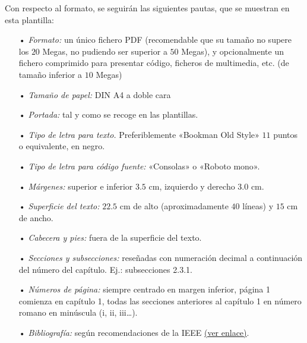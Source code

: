 Con respecto al formato, se seguirán las siguientes pautas, que se muestran en esta plantilla:
\begin{itemize}
\item[•] \textit{Formato:} un único fichero PDF (recomendable que su tamaño no supere los $20$ Megas, no pudiendo ser superior a $50$ Megas), y opcionalmente un fichero comprimido para presentar código, ficheros de multimedia, etc. (de tamaño inferior a $10$ Megas)
\item[•] \textit{Tamaño de papel:} DIN A4 a doble cara
\item[•] \textit{Portada:} tal y como se recoge en las plantillas.
\item[•] \textit{Tipo de letra para texto.} Preferiblemente «Bookman Old Style» $11$ puntos o equivalente, en negro.
\item[•] \textit{Tipo de letra para código fuente:} «Consolas» o «Roboto mono».
\item[•] \textit{Márgenes:} superior e inferior $3.5$ cm, izquierdo y derecho $3.0$ cm.
\item[•] \textit{Superficie del texto:} $22.5$ cm de alto (aproximadamente $40$ líneas) y $15$ cm de ancho.
\item[•] \textit{Cabecera y pies:} fuera de la superficie del texto.
\item[•] \textit{Secciones y subsecciones:} reseñadas con numeración decimal a continuación del número del capítulo. Ej.: subsecciones 2.3.1.
\item[•] \textit{Números de página:} siempre centrado en margen inferior, página 1 comienza en capítulo 1, todas las secciones anteriores al capítulo 1 en número romano en minúscula (i, ii, iii…).
\item[•] \textit{Bibliografía:} según recomendaciones de la IEEE
\href{https://www.etsiinf.upm.es/docs/estudios/grado/1475_ieeecitationref.pdf}{(ver enlace)}.
\end{itemize}

